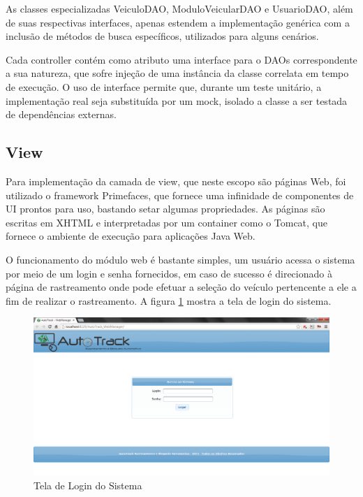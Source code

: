 As classes especializadas VeiculoDAO, ModuloVeicularDAO e UsuarioDAO, além de suas respectivas interfaces, apenas estendem a implementação genérica com a inclusão de métodos de busca específicos, utilizados para alguns cenários.

Cada controller contém como atributo uma interface para o DAOs correspondente a sua natureza, que sofre injeção de uma instância da classe correlata em tempo de execução. O uso de interface permite que, durante um teste unitário, a implementação real seja substituída por um mock, isolado a classe a ser testada de dependências externas.

\subsection{View}

Para implementação da camada de view, que neste escopo são páginas Web, foi utilizado o framework Primefaces, que fornece uma infinidade de componentes de UI prontos para uso, bastando setar algumas propriedades. As páginas são escritas em XHTML e interpretadas por um container como o Tomcat, que fornece o ambiente de execução para aplicações Java Web.

O funcionamento do módulo web é bastante simples, um usuário acessa o sistema por meio de um login e senha fornecidos, em caso de sucesso é direcionado à página de rastreamento onde pode efetuar a seleção do veículo pertencente a ele a fim de realizar o rastreamento. A figura \ref{fig:webmanviewlogin} mostra a tela de login do sistema.

\begin{figure}[!htb]
	\centering
	\includegraphics[width=15.00cm\textwidth]{figures/webmanager_login.png}
	\caption{Tela de Login do Sistema}
	\label{fig:webmanviewlogin}
\end{figure}

